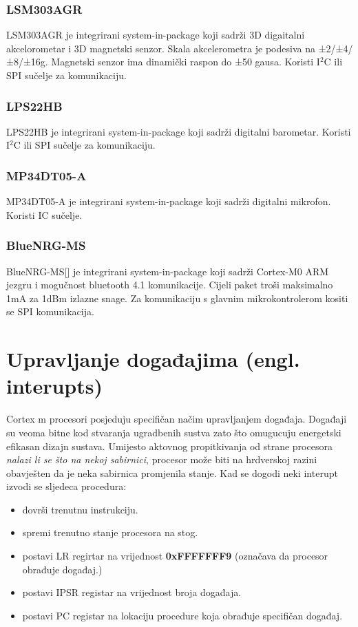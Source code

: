 \documentclass[times, utf8, diplomski]{diplomski}
\begin{document}
\subsubsection{LSM303AGR}
LSM303AGR je integrirani system-in-package koji sadrži 3D digaitalni akcelorometar i 3D magnetski senzor. Skala akcelerometra je podesiva na
±2/±4/±8/±16g. Magnetski senzor ima dinamički raspon do ±50 gausa. Koristi I\(^2\)C ili SPI sučelje za komunikaciju.

\subsubsection{LPS22HB}
LPS22HB je integrirani system-in-package koji sadrži digitalni barometar. Koristi I\(^2\)C ili SPI sučelje za komunikaciju.

\subsubsection{MP34DT05-A}
MP34DT05-A je integrirani system-in-package koji sadrži digitalni mikrofon. Koristi IC sučelje.

\subsubsection{BlueNRG-MS}
BlueNRG-MS[\cite{BlueNrgMs}] je integrirani system-in-package koji sadrži Cortex-M0 ARM jezgru i mogučnost bluetooth 4.1 komunikacije.
Cijeli paket troši maksimalno 1mA za 1dBm izlazne snage. Za komunikaciju s glavnim mikrokontrolerom kositi se SPI komunikacija.

\section{Upravljanje događajima (engl. interupts)}
Cortex m procesori posjeduju specifičan načim upravljanjem događaja. Događaji su veoma bitne kod stvaranja ugradbenih sustva zato što omugucuju energetski efikasan dizajn sustava.
Umijesto aktovnog propitkivanja od strane procesora \textit{nalazi li se što na nekoj sabirnici}, procesor može biti na hrdverskoj razini obavješten da je neka sabirnica promjenila stanje.
Kad se dogodi neki interupt izvodi se sljedeca procedura:

\begin{itemize}
  \item dovrši trenutnu instrukciju.
  \item spremi trenutno stanje procesora na stog.
  \item postavi LR regirtar na vrijednost \textbf{0xFFFFFFF9} (označava da procesor obrađuje događaj.)
  \item postavi IPSR registar na vrijednost broja događaja.
  \item postavi PC registar na lokaciju procedure koja obrađuje specifičan događaj.
\end{itemize}
\end{document}
